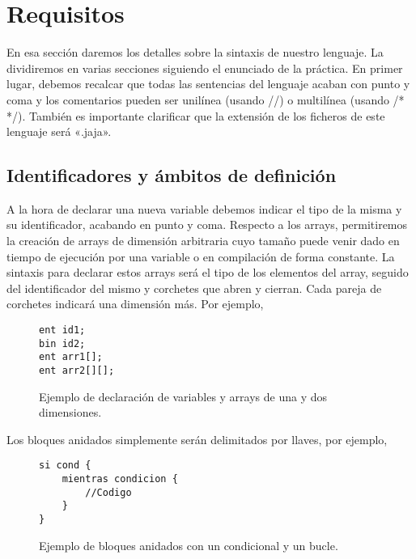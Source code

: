 \chapter*{Requisitos}
En esa sección daremos los detalles sobre la sintaxis de nuestro lenguaje. La
dividiremos en varias secciones siguiendo el enunciado de la práctica. En primer
lugar, debemos recalcar que todas las sentencias del lenguaje acaban con punto
y coma y los comentarios pueden ser unilínea (usando //) o multilínea (usando /*
*/). También es importante clarificar que la extensión de los ficheros de este
lenguaje será «.jaja».
\section*{Identificadores y ámbitos de definición}
A la hora de declarar una nueva variable debemos indicar el tipo de la misma y
su identificador, acabando en punto y coma. Respecto a los arrays,
permitiremos la creación de arrays de dimensión arbitraria cuyo tamaño puede
venir dado en tiempo de ejecución por una variable o en compilación de forma
constante. La sintaxis para declarar estos arrays será el tipo de los elementos del
array, seguido del identificador del mismo y corchetes que abren y cierran.
Cada pareja de corchetes indicará una dimensión más.
Por ejemplo,
\begin{figure}[H]
    \centering
    \begin{lstlisting}
ent id1;
bin id2;
ent arr1[];
ent arr2[][];
    \end{lstlisting}
    \caption{Ejemplo de declaración de variables y arrays de una y dos
    dimensiones.}
\end{figure}

Los bloques anidados simplemente serán delimitados por llaves, por ejemplo,
\begin{figure}[H]
    \centering
    \begin{lstlisting}
si cond {
    mientras condicion {
        //Codigo
    }
}
    \end{lstlisting}
    \caption{Ejemplo de bloques anidados con un condicional y un bucle.}
\end{figure}

